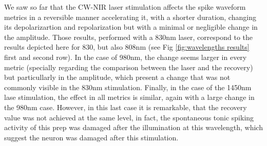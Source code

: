 We saw so far that the CW-NIR laser stimulation affects the spike waveform metrics in a reversible manner accelerating it, with a shorter duration, changing its depolarizartion and repolarization but with a minimal or negligible change in the amplitude. Those results, performed with a 830nm laser, correspond to the results depicted here for 830, but also 808nm (see Fig \ref{fig:wavelengths results} first and second row). In the case of 980nm, the change seems larger in every metric (specially regarding the comparison between the laser and the recovery) but particullarly in the amplitude, which present a change that was not commonly visible in the 830nm stimulation. Finally, in the case of the 1450nm lase stimulation, the effect in all metrics is similar, again with a large change in the 980nm case. However, in this last case it is remarkable, that the recovery value was not achieved at the same level, in fact, the spontaneous tonic spiking activity of this prep was damaged after the illumination at this wavelength, which suggest the neuron was damaged after this stimulation. 


